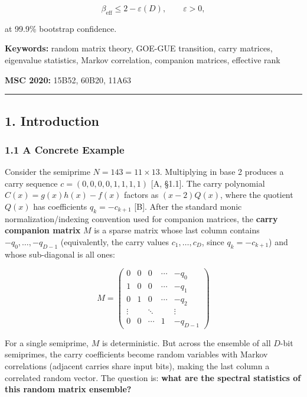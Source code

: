 \documentclass[
  11pt,
]{article}
\begin{document}
\[\beta_{\mathrm{eff}} \leq 2 - \varepsilon(D), \qquad \varepsilon > 0,\]

at 99.9\% bootstrap confidence.

\textbf{Keywords:} random matrix theory, GOE-GUE transition, carry matrices,
eigenvalue statistics, Markov correlation, companion matrices, effective rank

\textbf{MSC 2020:} 15B52, 60B20, 11A63

\begin{center}\rule{0.5\linewidth}{0.5pt}\end{center}

\newpage

\subsection{1. Introduction}\label{introduction}

\subsubsection{1.1 A Concrete Example}\label{a-concrete-example}

Consider the semiprime \(N = 143 = 11 \times 13\). Multiplying in base 2
produces a carry sequence \(c = (0, 0, 0, 0, 1, 1, 1, 1)\) {[}A, §1.1{]}. The
carry polynomial \(C(x) = g(x)h(x) - f(x)\) factors as \((x-2)Q(x)\), where the
quotient \(Q(x)\) has coefficients \(q_k = -c_{k+1}\) {[}B{]}. After the
standard monic normalization/indexing convention used for companion matrices,
the \textbf{carry companion matrix} \(M\) is a sparse matrix whose last column
contains \(-q_0, \ldots, -q_{D-1}\) (equivalently, the carry values
\(c_1, \ldots, c_D\), since \(q_k = -c_{k+1}\)) and whose sub-diagonal is all
ones:

\[M = \begin{pmatrix} 0 & 0 & 0 & \cdots & -q_0 \\ 1 & 0 & 0 & \cdots & -q_1 \\ 0 & 1 & 0 & \cdots & -q_2 \\ \vdots & & \ddots & & \vdots \\ 0 & 0 & \cdots & 1 & -q_{D-1} \end{pmatrix}\]

For a single semiprime, \(M\) is deterministic. But across the ensemble of all
\(D\)-bit semiprimes, the carry coefficients become random variables with Markov
correlations (adjacent carries share input bits), making the last column a
correlated random vector. The question is: \textbf{what are the spectral
statistics of this random matrix ensemble?}
\end{document}
